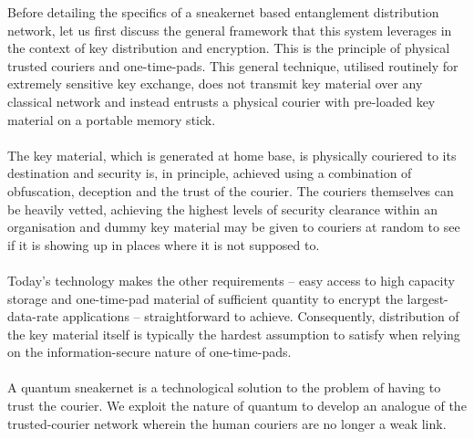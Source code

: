 \documentclass[aps,prl,twocolumn,10pt,nofootinbib]{revtex4}
\begin{document}
Before detailing the specifics of a sneakernet based entanglement distribution network, let us first discuss the general framework that this system leverages in the context of key distribution and encryption.  This is the principle of physical trusted couriers and one-time-pads.  This general technique, utilised routinely for extremely sensitive key exchange, does not transmit key material over any classical network and instead entrusts a physical courier with pre-loaded key material on a portable memory stick.  
\\
\\
The key material, which is generated at home base, is physically couriered to its destination and security is, in principle, achieved using a combination of obfuscation, deception and the trust of the courier.  The couriers themselves can be heavily vetted, achieving the highest levels of security clearance within an organisation and dummy key material may be given to couriers at random to see if it is showing up in places where it is not supposed to.  
\\
\\
Today's technology makes the other requirements -- easy access to high capacity storage and one-time-pad material of sufficient quantity to encrypt the largest-data-rate applications -- straightforward to achieve. Consequently, distribution of the key material itself is typically the hardest assumption to satisfy when relying on the information-secure nature of one-time-pads.
\\
\\
A quantum sneakernet is a technological solution to the problem of having to trust the courier.  We exploit the nature of quantum to develop an analogue of the trusted-courier network wherein the human couriers are no longer a weak link.  
\end{document}
